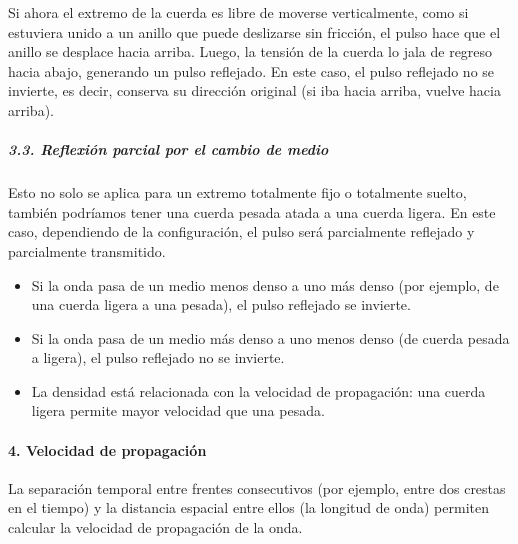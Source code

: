 Si ahora el extremo de la cuerda es libre de moverse verticalmente, como si estuviera unido a un anillo que puede deslizarse sin fricción, el pulso hace que el anillo se desplace hacia arriba. Luego, la tensión de la cuerda lo jala de regreso hacia abajo, generando un pulso reflejado. En este caso, el pulso reflejado no se invierte, es decir, conserva su dirección original (si iba hacia arriba, vuelve hacia arriba).

\subparagraph{3.3. Reflexión parcial por el cambio de medio}

Esto no solo se aplica para un extremo totalmente fijo o totalmente suelto, también podríamos tener una cuerda pesada atada a una cuerda ligera. En este caso, dependiendo de la configuración, el pulso será parcialmente reflejado y parcialmente transmitido.
\begin{itemize}
  \item Si la onda pasa de un medio menos denso a uno más denso (por ejemplo, de una cuerda ligera a una pesada), el pulso reflejado se invierte.
  \item Si la onda pasa de un medio más denso a uno menos denso (de cuerda pesada a ligera), el pulso reflejado no se invierte.
  \item La densidad está relacionada con la velocidad de propagación: una cuerda ligera permite mayor velocidad que una pesada.
\end{itemize}

\paragraph{4. Velocidad de propagación}

La separación temporal entre frentes consecutivos (por ejemplo, entre dos crestas en el tiempo) y la distancia espacial entre ellos (la longitud de onda) permiten calcular la velocidad de propagación de la onda.